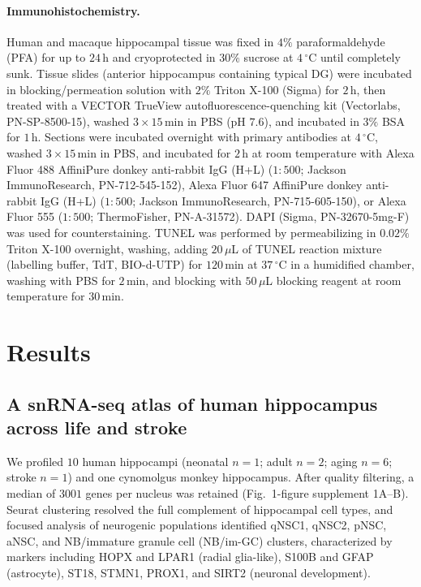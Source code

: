 \documentclass[11pt]{article}
\begin{document}
\paragraph{Immunohistochemistry.} Human and macaque hippocampal tissue was fixed in $4\%$ paraformaldehyde (PFA) for up to $24$\,h and cryoprotected in $30\%$ sucrose at $4\,^\circ$C until completely sunk. Tissue slides (anterior hippocampus containing typical DG) were incubated in blocking/permeation solution with $2\%$ Triton X-100 (Sigma) for $2$\,h, then treated with a VECTOR TrueView autofluorescence-quenching kit (Vectorlabs, PN-SP-8500-15), washed $3 \times 15$\,min in PBS (pH $7.6$), and incubated in $3\%$ BSA for $1$\,h. Sections were incubated overnight with primary antibodies at $4\,^\circ$C, washed $3 \times 15$\,min in PBS, and incubated for $2$\,h at room temperature with Alexa Fluor 488 AffiniPure donkey anti-rabbit IgG (H+L) ($1{:}500$; Jackson ImmunoResearch, PN-712-545-152), Alexa Fluor 647 AffiniPure donkey anti-rabbit IgG (H+L) ($1{:}500$; Jackson ImmunoResearch, PN-715-605-150), or Alexa Fluor 555 ($1{:}500$; ThermoFisher, PN-A-31572). DAPI (Sigma, PN-32670-5mg-F) was used for counterstaining. TUNEL was performed by permeabilizing in $0.02\%$ Triton X-100 overnight, washing, adding $20\,\mu$L of TUNEL reaction mixture (labelling buffer, TdT, BIO-d-UTP) for $120$\,min at $37\,^\circ$C in a humidified chamber, washing with PBS for $2$\,min, and blocking with $50\,\mu$L blocking reagent at room temperature for $30$\,min.

\section{Results}

\subsection{A snRNA-seq atlas of human hippocampus across life and stroke}
We profiled $10$ human hippocampi (neonatal $n = 1$; adult $n = 2$; aging $n = 6$; stroke $n = 1$) and one cynomolgus monkey hippocampus. After quality filtering, a median of $3001$ genes per nucleus was retained (Fig.~1-figure supplement 1A--B). Seurat clustering resolved the full complement of hippocampal cell types, and focused analysis of neurogenic populations identified qNSC1, qNSC2, pNSC, aNSC, and NB/immature granule cell (NB/im-GC) clusters, characterized by markers including HOPX and LPAR1 (radial glia-like), S100B and GFAP (astrocyte), ST18, STMN1, PROX1, and SIRT2 (neuronal development).
\end{document}
